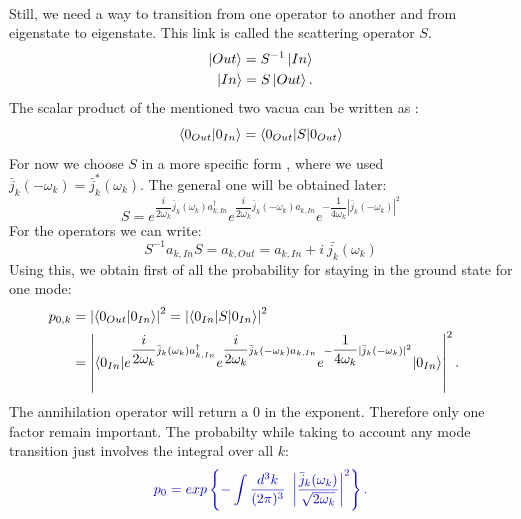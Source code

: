 \documentclass[12pt, titlepage]{article}
\begin{document}
\\
Still, we need a way to transition from one operator to another and from eigenstate to eigenstate. This link is called the scattering operator $ S $.
\begin{subequations}
\begin{align}
\ket{Out}=S^{-1}\ket{In}
&\\
\ket{In}=S\ket{Out}.
\end{align}
\end{subequations}
The scalar product of the mentioned two vacua can be written as :
\begin{equation}
\braket{0_{Out}|0_{In}}=\braket{0_{Out}|S|0_{Out}}
\end{equation}
For now we choose $ S $ in a more specific form , where we used $ \bar{j}_{k}(-\omega_{k}) = \bar{j}^{\ast}_{k}(\omega_{k})  $. The general one will be obtained later:
\begin{equation}
S=e^{\dfrac{i}{2\omega_{k}}\bar{j}_{k}(\omega_{k})a^{\dagger}_{k,In}}
e^{\dfrac{i}{2\omega_{k}}\bar{j}_{k}(-\omega_{k})a_{k,In}}
e^{-\dfrac{1}{4\omega_{k}}|\bar{j}_{k}(-\omega_{k})|^{2}}
\end{equation}
For the operators we can write:
\begin{equation}
S^{-1}a_{k,In}S=a_{k,Out}=a_{k,In} +i\ \bar{j_{k}}(\omega_{k})
\end{equation}
%
%
Using this, we obtain first of all the probability for staying in the ground state for one mode:
\begin{subequations}
\begin{align}
p_{0,k}&=\left| \braket{0_{Out}|0_{In}}\right|^{2}=\left| \braket{0_{In}|S|0_{In}}\right|^{2}
	&\\
	&=\left| \braket{0_{In}|e^{\dfrac{i}{2\omega_{k}}\bar{j}_{k}(\omega_{k})a^{\dagger}_{k,In}}
e^{\dfrac{i}{2\omega_{k}}\bar{j}_{k}(-\omega_{k})a_{k,In}}
e^{-\dfrac{1}{4\omega_{k}}|\bar{j}_{k}(-\omega_{k})|^{2}}|0_{In}}\right|^{2}
.
\end{align}
\end{subequations}
The annihilation operator will return a $ 0 $ in the exponent. Therefore only one factor remain important. The probabilty while taking to account any mode transition just involves the integral over all $ k $:
\begin{equation}\label{prob_staying}
 \textcolor[RGB]{0,0,204}{
	p_{0}
	= 	exp\left\lbrace -\int \dfrac{d^{3}k}{(2\pi)^{3}} \ 
 		 			 \left| \dfrac{\bar{j}_{k}(\omega_{k})}{\sqrt{2\omega_{k}}} \right|^{2}
 		 			 \right\rbrace 
 .}
\end{equation}
\end{document}
